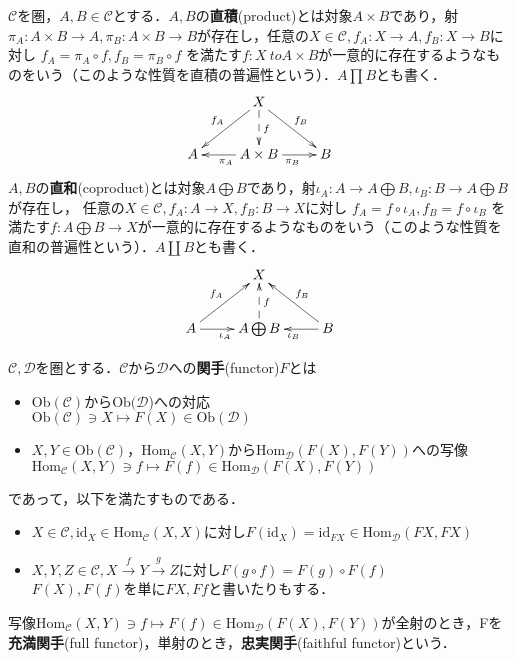 \begin{defi}
$\mathcal{C}$を圏，$A,B\in \mathcal{C}$とする．$A,B$の{\bf 直積}(product)とは対象$A \times B$であり，射$\pi_A : A \times B \to A , 
\pi_B : A \times B \to B$が存在し，任意の$X \in \mathcal{C}, f_A : X \to A , f_B: X \to B$に対し $f_A = \pi_A \circ f , f_B = \pi_B \circ f$
を満たす$f : X\ to A \times B$が一意的に存在するようなものをいう（このような性質を直積の普遍性という）．$A \prod B$とも書く．\\
\[
\xymatrix{
	& \ar[dl]_{f_A} X  \ar@{-->}[d]^{f}  \ar[dr]^{f_B}	& \\
A 	& \ar[l]^{\pi_A} A \times B \ar[r]_{\pi_B} 	& B 
}
\]
$A,B$の{\bf 直和}(coproduct)とは対象$A \bigoplus B$であり，射$\iota_A : A  \to A \bigoplus B, 
\iota_B : B \to  A \bigoplus B$が存在し，
任意の$X \in \mathcal{C}, f_A : A \to X , f_B: B \to X$に対し $f_A = f \circ \iota_A , f_B = f \circ \iota_B$
を満たす$f : A \bigoplus B \to X$が一意的に存在するようなものをいう（このような性質を直和の普遍性という）．$A \coprod B$とも書く．\\
\[
\xymatrix{
	& \ar@{<-}[dl]_{f_A} X  \ar@{<--}[d]^{f}  \ar@{<-}[dr]^{f_B}	& \\
A \ar[r]_{\iota_A}	&  A \bigoplus B  & \ar[l]^{\iota_B} B 
}
\] 
\end{defi} \proofend

\begin{defi}
$\mathcal{C,D}$を圏とする．$\mathcal{C}$から$\mathcal{D}$への{\bf 関手}(functor)$F$とは
\begin{itemize}
\item 
$\mathrm{Ob}(\mathcal{C})$から$\mathrm{Ob}(\mathcal{D}$)への対応\\
 $\mathrm{Ob}(\mathcal{C}) \ni X \mapsto F(X) \in \mathrm{Ob}(\mathcal{D})$
 
 \item 
$X,Y \in \mathrm{Ob}(\mathcal{C})$，$\mathrm{Hom}_\mathcal{C}(X,Y) $から$\mathrm{Hom}_\mathcal{D}(F(X),F(Y))$への写像\\
$\mathrm{Hom}_\mathcal{C}(X,Y) \ni f \mapsto F(f) \in \mathrm{Hom}_\mathcal{D}(F(X),F(Y))$
\end{itemize}
 であって，以下を満たすものである．
 
 \begin{itemize}
 \item
 $X \in \mathcal{C}, \mathrm{id}_X \in \mathrm{Hom}_\mathcal{C}(X,X)$に対し$F(\mathrm{id}_X) = \mathrm{id}_{FX} \in \mathrm{Hom}_\mathcal{D}(FX,FX)$
 \item
 $X,Y,Z \in \mathcal{C}, X \xrightarrow{f} Y \xrightarrow{g} Z$に対し$F(g \circ f) = F(g) \circ F(f)$ \\
 $F(X),F(f)$を単に$FX,Ff$と書いたりもする．
  
 \end{itemize}
 写像$\mathrm{Hom}_\mathcal{C}(X,Y) \ni f \mapsto F(f) \in \mathrm{Hom}_\mathcal{D}(F(X),F(Y))$が全射のとき，Fを{\bf 充満関手}(full functor)，単射のとき，{\bf 忠実関手}(faithful functor)という．
\end{defi} \proofend

